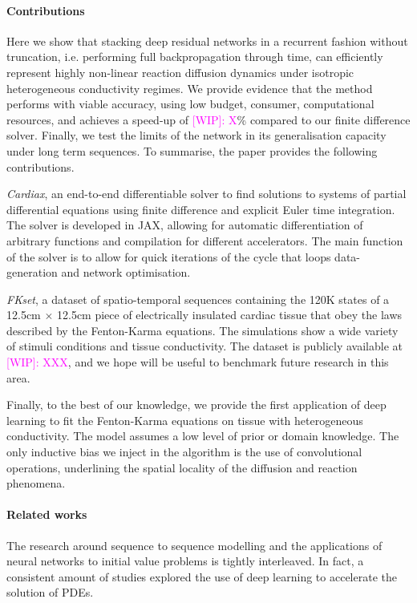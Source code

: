\documentclass{article}
\newcommand{\WIP}[1]{\textcolor{magenta}{[WIP]: #1}}
\begin{document}
        \paragraph{Contributions}
            Here we show that stacking deep residual networks in a recurrent fashion without truncation, i.e. performing full backpropagation through time, can efficiently represent
            highly non-linear reaction diffusion dynamics %
            under isotropic heterogeneous conductivity regimes. 
            We provide evidence that the method performs with viable accuracy, using low budget, consumer, computational resources, and achieves a speed-up of \WIP{X}\% compared to our finite difference solver. Finally, we test the limits of the network in its generalisation capacity under long term sequences.
            To summarise, the paper provides the following contributions.
            
            \textit{Cardiax}, an end-to-end differentiable solver to find solutions to systems of partial differential equations using finite difference and explicit Euler time integration. The solver is developed in JAX\cite{FrostigCompilingTracing, jax2018github}, allowing for automatic differentiation of arbitrary functions and compilation for different accelerators. The main function of the solver is to allow for quick iterations of the cycle that loops data-generation and network optimisation.
            
            \textit{FKset}, a dataset of spatio-temporal sequences containing the 120K states of a 12.5cm $\times$ 12.5cm piece of electrically insulated cardiac tissue that obey the laws described by the Fenton-Karma equations. The simulations show a wide variety of stimuli conditions and tissue conductivity. The dataset is publicly available at \WIP{XXX}, and we hope will be useful to benchmark future research in this area.
            
            Finally, to the best of our knowledge, we provide the first application of deep learning to fit the Fenton-Karma equations on tissue with heterogeneous conductivity. The model assumes a low level of prior or domain knowledge. The only inductive bias we inject in the algorithm is the use of convolutional operations, underlining the spatial locality of the diffusion and reaction phenomena.
        
        \paragraph{Related works}
            The research around sequence to sequence modelling and the applications of neural networks to initial value problems is tightly interleaved.
            In fact, a consistent amount of studies explored the use of deep learning to accelerate the solution of PDEs. 
            
\end{document}
